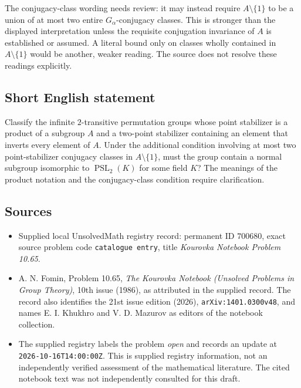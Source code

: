 \documentclass[11pt]{article}
\begin{document}
The conjugacy-class wording needs review: it may instead require \(A\setminus\{1\}\) to be a union of at most two entire \(G_\alpha\)-conjugacy classes. This is stronger than the displayed interpretation unless the requisite conjugation invariance of \(A\) is established or assumed. A literal bound only on classes wholly contained in \(A\setminus\{1\}\) would be another, weaker reading. The source does not resolve these readings explicitly.
\subsection{Short English statement}
Classify the infinite \(2\)-transitive permutation groups whose point stabilizer is a product of a subgroup \(A\) and a two-point stabilizer containing an element that inverts every element of \(A\). Under the additional condition involving at most two point-stabilizer conjugacy classes in \(A\setminus\{1\}\), must the group contain a normal subgroup isomorphic to \(\operatorname{PSL}_2(K)\) for some field \(K\)? The meanings of the product notation and the conjugacy-class condition require clarification.
\subsection{Sources}
\begin{itemize}
\item Supplied local UnsolvedMath registry record: permanent ID \(700680\), exact source problem code \texttt{catalogue entry}, title \emph{Kourovka Notebook Problem 10.65}.
\item A. N. Fomin, Problem 10.65, \emph{The Kourovka Notebook (Unsolved Problems in Group Theory)}, 10th issue (1986), as attributed in the supplied record. The record also identifies the 21st issue edition (2026), \texttt{arXiv:1401.0300v48}, and names E. I. Khukhro and V. D. Mazurov as editors of the notebook collection.
\item The supplied registry labels the problem \emph{open} and records an update at \texttt{2026-10-16T14:00:00Z}. This is supplied registry information, not an independently verified assessment of the mathematical literature. The cited notebook text was not independently consulted for this draft.
\end{itemize}
\end{document}

